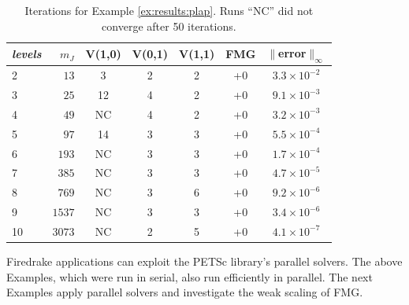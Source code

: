 \documentclass[review,hidelinks,onefignum,onetabnum,final]{siamart220329}  %
\begin{document}
\begin{table}[ht]
\centering
\begin{tabular}{lr@{\hskip 7mm}c@{\hskip 3mm}c@{\hskip 3mm}c@{\hskip 4mm}c@{\hskip 6mm}c}
\toprule
\emph{levels} & $m_J$ & V(1,0) & V(0,1) & V(1,1) & FMG & $\|$error$\|_\infty$ \\
\midrule
 2 &   $13$ &  3 &  2 &  2 &  +0 & $3.3 \times 10^{-2}$ \\
 3 &   $25$ & 12 &  4 &  2 &  +0 & $9.1 \times 10^{-3}$ \\
 4 &   $49$ & NC &  4 &  2 &  +0 & $3.2 \times 10^{-3}$ \\
 5 &   $97$ & 14 &  3 &  3 &  +0 & $5.5 \times 10^{-4}$ \\
 6 &  $193$ & NC &  3 &  3 &  +0 & $1.7 \times 10^{-4}$ \\
 7 &  $385$ & NC &  3 &  3 &  +0 & $4.7 \times 10^{-5}$ \\
 8 &  $769$ & NC &  3 &  6 &  +0 & $9.2 \times 10^{-6}$ \\
 9 & $1537$ & NC &  3 &  3 &  +0 & $3.4 \times 10^{-6}$ \\
10 & $3073$ & NC &  2 &  5 &  +0 & $4.1 \times 10^{-7}$ \\
\bottomrule
\end{tabular}
\bigskip
\caption{Iterations for Example \ref{ex:results:plap}.  Runs ``NC'' did not converge after 50 iterations.}
\label{tab:results:fastplap1d}
\end{table}

Firedrake applications can exploit the PETSc \cite{Balayetal2023} library's parallel solvers.  The above Examples, which were run in serial, also run efficiently in parallel.  The next Examples apply parallel solvers and investigate the weak scaling of FMG.
\end{document}
